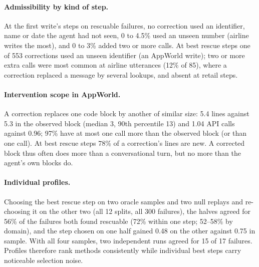 \documentclass[11pt]{article}
\newcommand{\Rhat}{R(\hat{k})}
\begin{document}
\begin{table}[t]
\centering
\footnotesize
\setlength{\tabcolsep}{2pt}
\caption{Mean $\Rhat$ on the 157 rescuable failures by the kind of their best rescue step (cells with at least 5 failures). AAO, BS: all-at-once and binary search with Pro; CF: counterfactual search@40; $_g$: asked for the largest gain over null; $_i$: given the grading information. State-changing steps are writes and AppWorld's submission; the last row weights the eight cells above equally.}
\label{tab:strata}
\end{table}

\paragraph{Admissibility by kind of step.} At the first write's steps on rescuable failures, no correction used an identifier, name or date the agent had not seen, 0 to 4.5\% used an unseen number (airline writes the most), and 0 to 3\% added two or more calls. At best rescue steps one of 553 corrections used an unseen identifier (an AppWorld write); two or more extra calls were most common at airline utterances (12\% of 85), where a correction replaced a message by several lookups, and absent at retail steps.

\paragraph{Intervention scope in AppWorld.} A correction replaces one code block by another of similar size: 5.4 lines against 5.3 in the observed block (median 3, 90th percentile 13) and 1.04 API calls against 0.96; 97\% have at most one call more than the observed block (or than one call). At best rescue steps 78\% of a correction's lines are new. A corrected block thus often does more than a conversational turn, but no more than the agent's own blocks do.

\paragraph{Individual profiles.} Choosing the best rescue step on two oracle samples and two null replays and re-choosing it on the other two (all 12 splits, all 300 failures), the halves agreed for 56\% of the failures both found rescuable (72\% within one step; 52--58\% by domain), and the step chosen on one half gained 0.48 on the other against 0.75 in sample. With all four samples, two independent runs agreed for 15 of 17 failures. Profiles therefore rank methods consistently while individual best steps carry noticeable selection noise.
\end{document}

